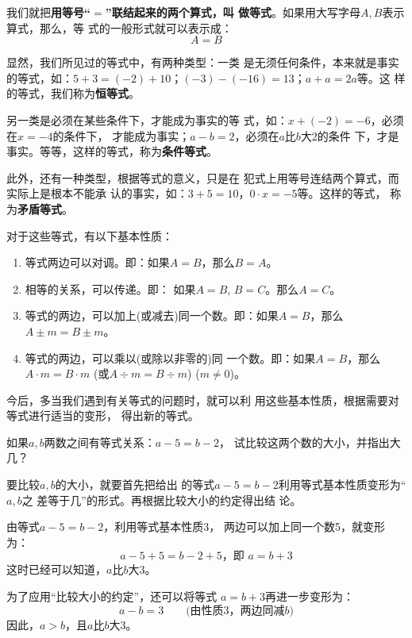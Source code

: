 我们就把\textbf{用等号“$=$”联结起来的两个算式，叫
做等式}。如果用大写字母$A, B$表示算式，那么，等
式的一般形式就可以表示成：
                      \[A=B\]
                      
显然，我们所见过的等式中，有两种类型：一类
是无须任何条件，本来就是事实的等式，如：$5+3=
  (-2)+10$；$(-3)-(-16)= 13$；$a+a=2a$等。这
样的等式，我们称为\textbf{恒等式}。

另一类是必须在某些条件下，才能成为事实的等
式，如：$x+(-2)=-6$，必须在$x=-4$的条件下，
才能成为事实；$a-b=2$，必须在$a$比$b$大2的条件
下，才是事实。等等，这样的等式，称为\textbf{条件等式}。

    此外，还有一种类型，根据等式的意义，只是在
犯式上用等号连结两个算式，而实际上是根本不能承
认的事实，如：$3+5=10$，$0\cdot x=-5$等。这样的等式，
称为\textbf{矛盾等式}。

对于这些等式，有以下基本性质：

\begin{blk}{}
\begin{enumerate}
    \item 等式两边可以对调。即：如果$A= B$，那么$B=A$。
    \item 相等的关系，可以传递。即：
    如果$A=B$,  $B=C$。那么$A=C$。
    \item 等式的两边，可以加上(或减去)同一个数。即：如果$A= B$，那么$A\pm m=B\pm m$。
    \item 等式的两边，可以乘以(或除以非零的)同
一个数。即：如果$A=B$，那么$A\cdot m=B\cdot m$ (或$A\div m =
B\div m$) ($m\ne 0$)。
\end{enumerate}
\end{blk}


今后，多当我们遇到有关等式的问题时，就可以利
用这些基本性质，根据需要对等式进行适当的变形，
得出新的等式。

\begin{example}
    如果$a,b$两数之间有等式关系：$a-5=b-2$，
试比较这两个数的大小，并指出大几？
\end{example}

\begin{analyze}
    要比较$a,b$的大小，就要首先把给出
的等式$a-5=b-2$利用等式基本性质变形为“$a, b$之
差等于几”的形式。再根据比较大小的约定得出结
论。
\end{analyze}

\begin{solution}
    由等式$a-5=b-2$，利用等式基本性质3，
两边可以加上同一个数5，就变形为：
      \[a-5+5=b-2+5，\text{即 } a=b+3\]
    这时已经可以知道，$a$比$b$大3。

    为了应用“比较大小的约定”，还可以将等式
$a=b+3$再进一步变形为：
\[a-b=3\qquad \text{(由性质3，两边同减$b$)}\]
    因此，$a>b$，且$a$比$b$大3。
\end{solution}

